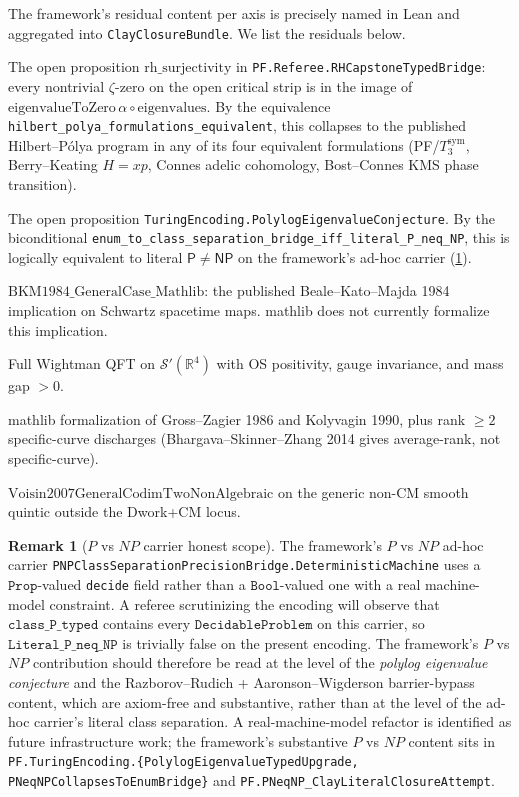 \documentclass[11pt,a4paper]{article}
\theoremstyle{plain}
\theoremstyle{definition}
\newtheorem{remark}[theorem]{Remark}
\begin{document}
The framework's residual content per axis is precisely named in
Lean and aggregated into \texttt{ClayClosureBundle}. We list the
residuals below.

\begin{description}[leftmargin=*,style=nextline]
\item[RH] The open proposition
$\mathrm{rh\_surjectivity}$ in
\texttt{PF.Referee.RHCapstoneTypedBridge}: every nontrivial
$\zeta$-zero on the open critical strip is in the image of
$\mathrm{eigenvalueToZero}\,\alpha \circ \mathrm{eigenvalues}$. By
the equivalence
\texttt{hilbert\_polya\_formulations\_equivalent}, this collapses to
the published Hilbert--P\'olya program in any of its four equivalent
formulations (PF/$T_{3}^{\mathrm{sym}}$, Berry--Keating
$H = xp$, Connes adelic cohomology, Bost--Connes KMS phase
transition).
\item[$P$ vs $NP$] The open proposition
\texttt{TuringEncoding.PolylogEigenvalueConjecture}. By the
biconditional
\texttt{enum\_to\_class\_separation\_bridge\_iff\_literal\_P\_neq\_NP},
this is logically equivalent to literal $\mathsf{P} \ne \mathsf{NP}$
on the framework's ad-hoc carrier (\cref{rem:pvsnp_carrier}).
\item[NS] $\mathrm{BKM1984\_GeneralCase\_Mathlib}$: the published
Beale--Kato--Majda 1984 implication on Schwartz spacetime maps.
mathlib does not currently formalize this implication.
\item[YM] Full Wightman QFT on $\mathcal{S}'(\mathbb{R}^{4})$
with OS positivity, gauge invariance, and mass gap $> 0$.
\item[BSD] mathlib formalization of Gross--Zagier 1986 and
Kolyvagin 1990, plus rank $\ge 2$ specific-curve discharges
(Bhargava--Skinner--Zhang 2014 gives average-rank, not specific-curve).
\item[Hodge] $\mathrm{Voisin2007GeneralCodimTwoNonAlgebraic}$ on the
generic non-CM smooth quintic outside the Dwork+CM locus.
\end{description}

\begin{remark}[$P$ vs $NP$ carrier honest scope]
\label{rem:pvsnp_carrier}
The framework's $P$ vs $NP$ ad-hoc carrier
\texttt{PNPClassSeparationPrecisionBridge.DeterministicMachine}
uses a $\mathtt{Prop}$-valued \texttt{decide} field rather than a
$\mathtt{Bool}$-valued one with a real machine-model constraint. A
referee scrutinizing the encoding will observe that
$\mathtt{class\_P\_typed}$ contains every
$\mathtt{DecidableProblem}$ on this carrier, so
$\mathtt{Literal\_P\_neq\_NP}$ is trivially false on the present
encoding. The framework's $P$ vs $NP$ contribution should therefore
be read at the level of the \emph{polylog eigenvalue conjecture} and
the Razborov--Rudich + Aaronson--Wigderson barrier-bypass content,
which are axiom-free and substantive, rather than at the level of
the ad-hoc carrier's literal class separation. A real-machine-model
refactor is identified as future infrastructure work; the framework's
substantive $P$ vs $NP$ content sits in
\texttt{PF.TuringEncoding.\{PolylogEigenvalueTypedUpgrade,\\
PNeqNPCollapsesToEnumBridge\}} and
\texttt{PF.PNeqNP\_ClayLiteralClosureAttempt}.
\end{remark}
\end{document}
